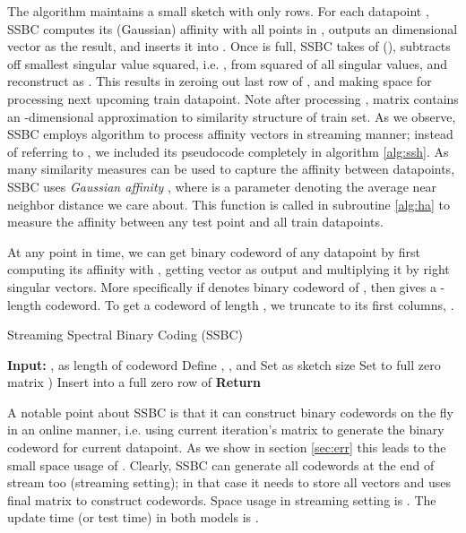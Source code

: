 \documentclass{sig-alternate}
\begin{document}
The algorithm maintains a small sketch  with only  rows. For each datapoint , SSBC computes its (Gaussian) affinity with all points in , outputs an  dimensional vector  as the result, and inserts it into . Once  is full, SSBC takes \svd of  (), subtracts off smallest singular value squared, i.e. , from squared of all singular values, and reconstruct  as . This results in zeroing out last row of , and making space for processing next upcoming train datapoint. Note after processing , matrix  contains an -dimensional approximation to similarity structure of train set. 
As we observe, SSBC employs \FD algorithm \cite{Lib12} to process affinity vectors in streaming manner; instead of referring to \FD, we included its pseudocode completely in algorithm \ref{alg:ssh}. 
As many similarity measures can be used to capture the affinity between datapoints, SSBC uses \textit{Gaussian affinity} , where  is a parameter denoting the average near neighbor distance we care about. 
This function is called in subroutine \ref{alg:ha} to measure the affinity between any test point and all train datapoints.


At any point in time, we can get binary codeword of any datapoint  by first computing its affinity with , getting vector  as output and multiplying it by right singular vectors. More specifically if  denotes binary codeword of , then  gives a -length codeword. To get a codeword of length , we truncate  to its first  columns, . 


\begin{algorithm}
\caption{\label{alg:ssh} Streaming Spectral Binary Coding (SSBC)}
\begin{algorithmic}
\STATE \textbf{Input:} ,  as length of codeword
\STATE Define , , and 
\STATE Set  as sketch size
\STATE Set  to full zero matrix
\FOR {}
  \STATE )
  \STATE Insert  into a full zero row of 
    \STATE 
    \STATE 
    \STATE 
  \ENDIF
\ENDFOR
\STATE \textbf{Return} 
\end{algorithmic}
\end{algorithm}

A notable point about SSBC is that it can construct binary codewords on the fly in an online manner, i.e. using current iteration's matrix  to generate the binary codeword for current datapoint. 
As we show in section \ref{sec:err} this leads to the small space usage of . Clearly, SSBC can generate all codewords at the end of stream too (streaming setting); in that case it needs to store all  vectors and uses final matrix  to construct codewords. Space usage in streaming setting is .
The update time (or test time) in both models is . 
\end{document}
